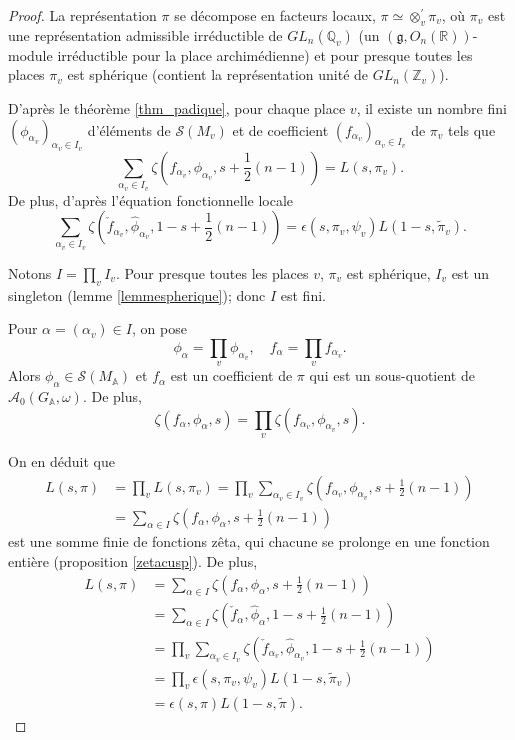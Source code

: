 \begin{proof}
La représentation $\pi$ se décompose en facteurs locaux,
$\pi \simeq \otimes_v^{'} \pi_v$, où $\pi_v$ est une représentation admissible irréductible de $GL_n(\mathbb{Q}_v)$ (un $(\mathfrak{g}, O_n(\mathbb{R}))$-module irréductible pour la place archimédienne) et pour presque toutes les places $\pi_v$ est sphérique (contient la représentation unité de $GL_n(\mathbb{Z}_v)$).

D'après le théorème \ref{thm_padique}, pour chaque place $v$, il existe un nombre fini $(\phi_{\alpha_v})_{\alpha_v \in I_v}$ d'éléments de $\mathcal{S}(M_v)$ et de coefficient $(f_{\alpha_v})_{\alpha_v \in I_v}$ de $\pi_v$ tels que
\begin{equation}
\sum_{\alpha_v \in I_v} \zeta(f_{\alpha_v}, \phi_{\alpha_v}, s + \frac{1}{2}(n-1)) = L(s, \pi_v).
\end{equation}
De plus, d'après l'équation fonctionnelle locale
\begin{equation}
\sum_{\alpha_v \in I_v} \zeta(\check{f}_{\alpha_v}, \hat{\phi}_{\alpha_v}, 1-s + \frac{1}{2}(n-1)) = \epsilon(s,\pi_v,\psi_v)L(1-s, \tilde{\pi}_v).
\end{equation}

Notons $I = \prod_v I_v$. Pour presque toutes les places $v$, $\pi_v$ est sphérique, $I_v$ est un singleton (lemme \ref{lemmespherique}); donc $I$ est fini.

Pour $\alpha = (\alpha_v) \in I$, on pose
\begin{equation}
\phi_\alpha = \prod_v \phi_{\alpha_v}, \quad f_\alpha = \prod_v f_{\alpha_v}.
\end{equation}
Alors $\phi_\alpha \in \mathcal{S}(M_\mathbb{A})$ et $f_\alpha$ est un coefficient de $\pi$ qui est un sous-quotient de $\mathcal{A}_0(G_\mathbb{A}, \omega)$. De plus,
\begin{equation}
\zeta(f_\alpha, \phi_\alpha, s) = \prod_v \zeta(f_{\alpha_v}, \phi_{\alpha_v}, s).
\end{equation}

On en déduit que
\begin{align}
L(s, \pi) &= \prod_v L(s, \pi_v) = \prod_v \sum_{\alpha_v \in I_v} \zeta(f_{\alpha_v}, \phi_{\alpha_v}, s + \frac{1}{2}(n-1)) \\
&= \sum_{\alpha \in I} \zeta(f_\alpha, \phi_\alpha, s + \frac{1}{2}(n-1))
\end{align}
est une somme finie de fonctions zêta, qui chacune se prolonge en une fonction entière (proposition \ref{zetacusp}). De plus,
\begin{align}
L(s, \pi) &= \sum_{\alpha \in I} \zeta(f_\alpha, \phi_\alpha, s + \frac{1}{2}(n-1)) \\
&= \sum_{\alpha \in I} \zeta(\check{f}_\alpha, \hat{\phi}_\alpha, 1 - s + \frac{1}{2}(n-1)) \\
&= \prod_v \sum_{\alpha_v \in I_v} \zeta(\check{f}_{\alpha_v}, \hat{\phi}_{\alpha_v}, 1-s + \frac{1}{2}(n-1)) \\
&= \prod_v \epsilon(s, \pi_v, \psi_v) L(1-s, \tilde{\pi}_v) \\
&= \epsilon(s, \pi)L(1-s, \tilde{\pi}).
\end{align}
\end{proof}